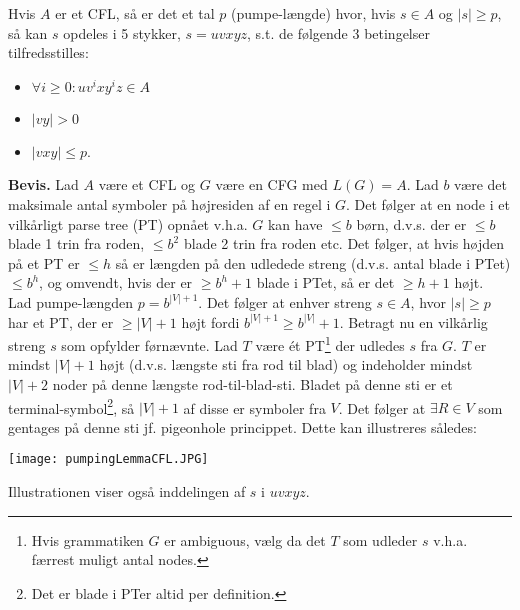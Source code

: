 Hvis $A$ er et CFL, så er det et tal $p$ (pumpe-længde) hvor, hvis $s \in A$ og $|s| \ge p$, så kan $s$ opdeles i 5 stykker, $s=uvxyz$, s.t. de følgende 3 betingelser tilfredsstilles: 
\begin{itemize}
	\item $\forall i \ge 0: uv^ixy^iz \in A$
	\item $|vy| > 0$
	\item $|vxy| \le p$. 
\end{itemize} 

\textbf{Bevis.} Lad $A$ være et CFL og $G$ være en CFG med $L(G)=A$. Lad $b$ være det maksimale antal symboler på højresiden af en regel i $G$. Det følger at en node i et vilkårligt parse tree (PT) opnået v.h.a. $G$ kan have $\le b$ børn, d.v.s. der er $\le b$ blade 1 trin fra roden, $\le b^2$ blade 2 trin fra roden etc. Det følger, at hvis højden på et PT er $\le h$ så er længden på den udledede streng (d.v.s. antal blade i PTet) $\le b^h$, og omvendt, hvis der er $\ge b^h+1$ blade i PTet, så er det $\ge h+1$ højt. \\

Lad pumpe-længden $p=b^{|V|+1}$. Det følger at enhver streng $s \in A$, hvor $|s| \ge p$ har et PT, der er $\ge |V|+1$ højt fordi $b^{|V|+1} \ge b^{|V|}+1$. Betragt nu en vilkårlig streng $s$ som opfylder førnævnte. Lad $T$ være ét PT\footnote{Hvis grammatiken $G$ er ambiguous, vælg da det $T$ som udleder $s$ v.h.a. færrest muligt antal nodes.} der udledes $s$ fra $G$. $T$ er mindst $|V|+1$ højt (d.v.s. længste sti fra rod til blad) og indeholder mindst $|V|+2$ noder på denne længste rod-til-blad-sti. Bladet på denne sti er et terminal-symbol\footnote{Det er blade i PTer altid per definition.}, så $|V|+1$ af disse er symboler fra $V$. Det følger at $\exists R \in V$ som gentages på denne sti jf. pigeonhole princippet. Dette kan illustreres således:
\begin{center}
	\texttt{[image: pumpingLemmaCFL.JPG]}
\end{center}
Illustrationen viser også inddelingen af $s$ i $uvxyz$. \\

